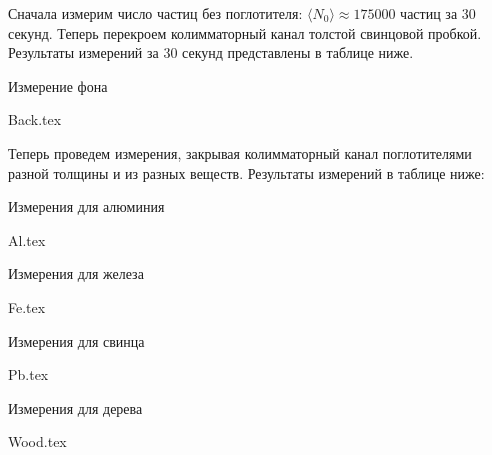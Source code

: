Сначала измерим число частиц без поглотителя: $\langle N_0 \rangle \approx
175000$ частиц за $30$ секунд. Теперь перекроем колимматорный канал толстой
свинцовой пробкой. Результаты измерений за 30 секунд представлены в таблице
ниже.

\begin{table}[h!]
  \centering
  \caption{Измерение фона}
  {Back.tex}
\end{table}

Теперь проведем измерения, закрывая колимматорный канал поглотителями разной
толщины и из разных веществ. Результаты измерений в таблице ниже:

\begin{table}[h!]
  \centering
  \caption{Измерения для алюминия}
  {Al.tex}
\end{table}

\begin{table}
  \centering
  \caption{Измерения для железа}
  {Fe.tex}
\end{table}

\begin{table}
  \centering
  \caption{Измерения для свинца}
  {Pb.tex}
\end{table}

\begin{table}
  \centering
  \caption{Измерения для дерева}
  {Wood.tex}
\end{table}


